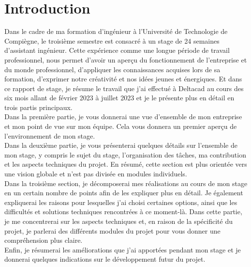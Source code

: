 \chapter*{Introduction}

Dans le cadre de ma formation d’ingénieur à l’Université de Technologie de Compiègne, le troisième semestre est consacré à un stage de 24 semaines d’assistant ingénieur. Cette expérience comme une longue période de travail professionnel, nous permet d’avoir un aperçu du fonctionnement de l’entreprise et du monde professionnel, d’appliquer les connaissances acquises lors de sa formation, d’exprimer notre créativité et nos idées jeunes et énergiques. Et dans ce rapport de stage, je résume le travail que j'ai effectué à Deltacad au cours des six mois allant de février 2023 à juillet 2023 et je le présente plus en détail en trois partis principaux.\\

Dans la première partie, je vous donnerai une vue d'ensemble de mon entreprise et mon point de vue sur mon équipe. Cela vous donnera un premier aperçu de l'environnement de mon stage.\\

Dans la deuxième partie, je vous présenterai quelques détails sur l'ensemble de mon stage, y compris le sujet du stage, l'organisation des tâches, ma contribution et les aspects techniques du projet. En résumé, cette section est plus orientée vers une vision globale et n'est pas divisée en modules individuels.\\

Dans la troisième section, je décomposerai mes réalisations au cours de mon stage en un certain nombre de points afin de les expliquer plus en détail. Je également expliquerai les raisons pour lesquelles j'ai choisi certaines options, ainsi que les difficultés et solutions techniques rencontrées à ce moment-là. Dans cette partie, je me concentrerai sur les aspects techniques et, en raison de la spécificité du projet, je parlerai des différents modules du projet pour vous donner une compréhension plus claire.\\

Enfin, je résumerai les améliorations que j'ai apportées pendant mon stage et je donnerai quelques indications sur le développement futur du projet. 
